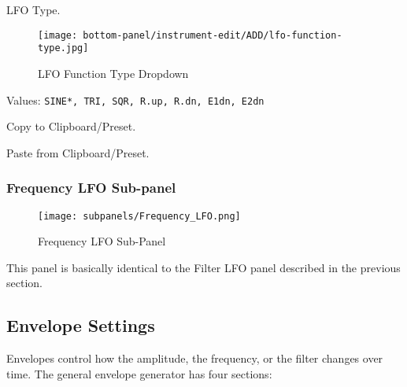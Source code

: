    LFO Type.

\begin{figure}[H]
   \centering 
   \texttt{[image: bottom-panel/instrument-edit/ADD/lfo-function-type.jpg]}
   \caption[LFO Function Types]{LFO Function Type Dropdown}
   \label{fig:frequency_lfo_dropdown}
\end{figure}

   Values: \texttt{SINE*, TRI, SQR, R.up, R.dn, E1dn, E2dn}

   Copy to Clipboard/Preset.

   Paste from Clipboard/Preset.

\subsubsection{Frequency LFO Sub-panel}
\label{subsubsec:frequency_lfo_sub_panel}

\begin{figure}[H]
   \centering 
   \texttt{[image: subpanels/Frequency\_LFO.png]}
   \caption[Frequency LFO Sub-Panel]{Frequency LFO Sub-Panel}
   \label{fig:frequency_lfo_subpanel}
\end{figure}

   This panel is basically identical to the Filter LFO panel described
   in the previous section.


\subsection{Envelope Settings}
\label{subsec:envelope_settings}

   Envelopes control how the amplitude, the frequency, or the filter changes
   over time.  The general envelope generator has four sections:

